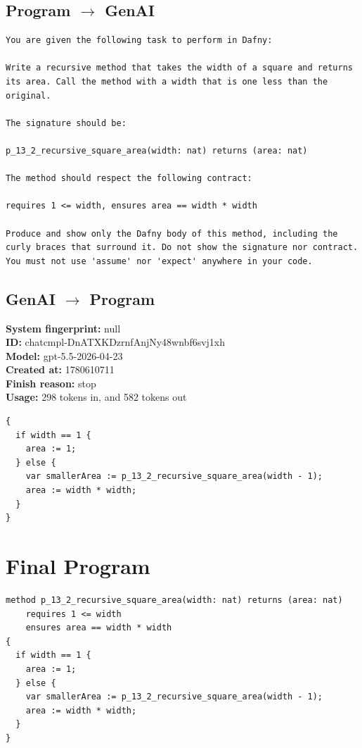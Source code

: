 \documentclass{article}
\begin{document}
\subsection*{Program $\rightarrow$ GenAI}
\begin{lstlisting}
You are given the following task to perform in Dafny:

Write a recursive method that takes the width of a square and returns its area. Call the method with a width that is one less than the original.

The signature should be:

p_13_2_recursive_square_area(width: nat) returns (area: nat)

The method should respect the following contract:

requires 1 <= width, ensures area == width * width

Produce and show only the Dafny body of this method, including the curly braces that surround it. Do not show the signature nor contract. You must not use 'assume' nor 'expect' anywhere in your code.
\end{lstlisting}
\subsection*{GenAI $\rightarrow$ Program}
\textbf{System fingerprint: }null
\\\textbf{ID: }chatcmpl-DnATXKDzrnfAnjNy48wnbf6svj1xh
\\\textbf{Model: }gpt-5.5-2026-04-23
\\\textbf{Created at: }1780610711
\\\textbf{Finish reason: }stop
\\\textbf{Usage: }298 tokens in, and 582 tokens out
\begin{lstlisting}
{
  if width == 1 {
    area := 1;
  } else {
    var smallerArea := p_13_2_recursive_square_area(width - 1);
    area := width * width;
  }
}
\end{lstlisting}
\section*{Final Program}
\begin{lstlisting}
method p_13_2_recursive_square_area(width: nat) returns (area: nat)
	requires 1 <= width
	ensures area == width * width
{
  if width == 1 {
    area := 1;
  } else {
    var smallerArea := p_13_2_recursive_square_area(width - 1);
    area := width * width;
  }
}
\end{lstlisting}
\end{document}
